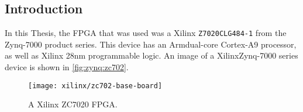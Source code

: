 \subsection{Introduction}
\label{zynq:introduction}
\nocite{Zynq7000:ProductBrief,Zynq7000:UserGuide}
In this Thesis, the \gls{FPGA} that was used was a Xilinx\textregistered
\verb+Z7020CLG484-1+ from the Zynq-7000 product series. This device has an
Arm\textregistered dual-core Cortex\texttrademark-A9 processor, as well as
Xilinx 28nm programmable logic. An image of a Xilinx\textregistered Zynq-7000
series device is shown in \autoref{fig:zynq:zc702}.

\begin{figure}
    \centering
    \texttt{[image: xilinx/zc702-base-board]}
    \caption{A Xilinx ZC7020 \gls{FPGA}.}
    \label{fig:zynq:zc702}
\end{figure}


